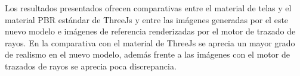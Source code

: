 Los resultados presentados ofrecen comparativas entre el material de telas y el material PBR est\'andar de ThreeJs
y entre las im\'agenes generadas por el este nuevo modelo e im\'agenes de referencia renderizadas por el motor de
trazado de rayos. En la comparativa con el material de ThreeJs se aprecia un mayor grado de realismo en el nuevo modelo, adem\'as
frente a las im\'agenes con el motor de trazados de rayos se aprecia poca discrepancia.












